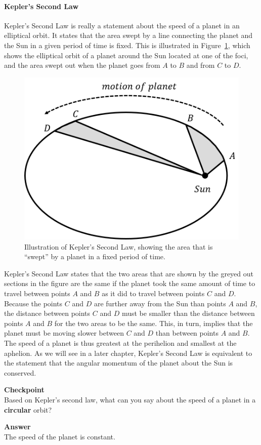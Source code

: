 \paragraph{Kepler's Second Law}

Kepler's Second Law is really a statement about the speed of a planet in an elliptical orbit. It states that the area swept by a line connecting the planet and the Sun in a given period of time is fixed. This is illustrated in Figure~\ref{fig:gravity:ellipse2}, which shows the elliptical orbit of a planet around the Sun located at one of the foci, and the area swept out when the planet goes from $A$ to $B$ and from $C$ to $D$.

\begin{figure}[!htbp]
\centering
\includegraphics[width=0.45\linewidth]{files/ellipse2-0f794ab73ee184ae96b7cea9e0ddef9e.png}
\caption[]{Illustration of Kepler's Second Law, showing the area that is ``swept'' by a planet in a fixed period of time.}
\label{fig:gravity:ellipse2}
\end{figure}

Kepler's Second Law states that the two areas that are shown by the greyed out sections in the figure are the same if the planet took the same amount of time to travel between points $A$ and $B$ as it did to travel between points $C$ and $D$. Because the points $C$ and $D$ are further away from the Sun than points $A$ and $B$, the distance between points $C$ and $D$ must be smaller than the distance between points $A$ and $B$ for the two areas to be the same. This, in turn, implies that the planet must be moving slower between $C$ and $D$ than between points $A$ and $B$. The speed of a planet is thus greatest at the perihelion and smallest at the aphelion. As we will see in a later chapter, Kepler's Second Law is equivalent to the statement that the angular momentum of the planet about the Sun is conserved.

\begin{framed}
\textbf{Checkpoint}\\
Based on Kepler's second law, what can you say about the speed of a planet in a \textbf{circular} orbit?

\begin{framed}
\textbf{Answer}\\
The speed of the planet is constant.
\end{framed}
\end{framed}

